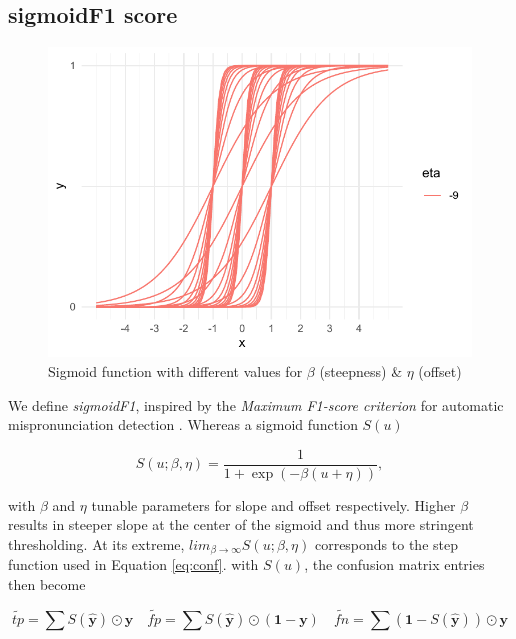 \subsection{sigmoidF1 score}
\label{sec:orgc5d29d7}


\begin{figure}[htbp]
\centering
\includegraphics[width=.9\linewidth]{./images/sigmoid.pdf}
\caption{\label{fig:sigmoid}
Sigmoid function with different values for $\beta$ (steepness) \& $\eta$ (offset)}
\end{figure}

We define \emph{sigmoidF1}, inspired by the \emph{Maximum F1-score criterion} for automatic mispronunciation detection \cite{sigmoid}. Whereas a sigmoid function \(S(u)\)

\begin{equation}
S(u; \beta, \eta)=\frac{1}{1+\exp (-\beta (u + \eta))},
\end{equation}

with \(\beta\) and \(\eta\) tunable parameters for slope and offset respectively. Higher \(\beta\) results in steeper slope at the center of the sigmoid and thus more stringent thresholding. At its extreme, \(lim_{\beta\to\infty} S(u; \beta, \eta)\) corresponds to the step function used in Equation \ref{eq:conf}. with \(S(u)\), the confusion matrix entries then become

\begin{equation}\label{eq:sigmoidF1}
\widetilde{\mathit{tp}}=\sum S(\hat{\mathbf{y}}) \odot \mathbf{y} \quad\widetilde{\mathit{fp}}= \sum S(\hat{\mathbf{y}}) \odot (\mathbf{1} - \mathbf{y}) \quad \widetilde{\mathit{fn}}= \sum (\mathbf{1} - S(\hat{\mathbf{y}})) \odot \mathbf{y}
\end{equation}

